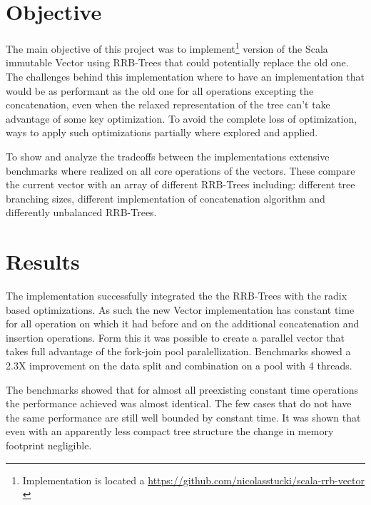 \section{Objective}
The main objective of this project was to implement\footnote{Implementation is located a \url{https://github.com/nicolasstucki/scala-rrb-vector} \cite{projecRepo}} version of the Scala immutable Vector using RRB-Trees that could potentially replace the old one. The challenges behind this implementation where to have an implementation that would be as performant as the old one for all operations excepting the concatenation, even when the relaxed representation of the tree can't take advantage of some key optimization. To avoid the complete loss of optimization, ways to apply such optimizations partially where explored and applied.

To show and analyze the tradeoffs between the implementations extensive benchmarks where realized on all core operations of the vectors. These compare the current vector with an array of different RRB-Trees including: different tree branching sizes, different implementation of concatenation algorithm and differently unbalanced RRB-Trees.  

\section{Results}

The implementation successfully integrated the the RRB-Trees with the radix based optimizations. As such the new Vector implementation has constant time for all operation on which it had before and on the additional concatenation and insertion operations. Form this it was possible to create a parallel vector that takes full advantage of the fork-join pool paralellization. Benchmarks showed a 2.3X improvement on the data split and combination on a pool with 4 threads.

The benchmarks showed that for almost all preexisting constant time operations the performance achieved was almost identical. The few cases that do not have the same performance are still well bounded by constant time. It was shown that even with an apparently less compact tree structure the change in memory footprint negligible.

